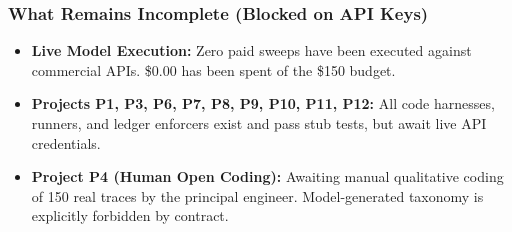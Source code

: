 \subsubsection{What Remains Incomplete (Blocked on API Keys)}
\begin{itemize}\setlength{\itemsep}{1.2pt}\setlength{\parsep}{0pt}
    \item \textbf{Live Model Execution:} Zero paid sweeps have been executed against commercial APIs. \$0.00 has been spent of the \$150 budget.
    \item \textbf{Projects P1, P3, P6, P7, P8, P9, P10, P11, P12:} All code harnesses, runners, and ledger enforcers exist and pass stub tests, but await live API credentials.
    \item \textbf{Project P4 (Human Open Coding):} Awaiting manual qualitative coding of 150 real traces by the principal engineer. Model-generated taxonomy is explicitly forbidden by contract.
\end{itemize}

